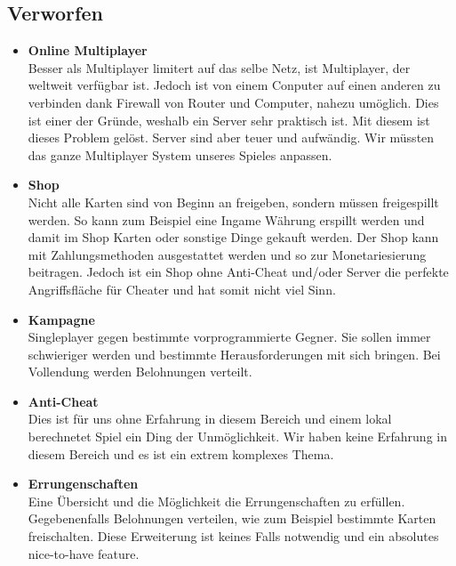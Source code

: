 \subsection*{Verworfen}
\begin{itemize}
    \item \textbf{Online Multiplayer} \\
        Besser als Multiplayer limitert auf das selbe Netz, ist Multiplayer, der weltweit verfügbar ist. Jedoch ist von einem Conputer auf einen anderen zu
        verbinden dank Firewall von Router und Computer, nahezu umöglich. Dies ist einer der Gründe, weshalb ein Server sehr praktisch ist. Mit diesem ist dieses
        Problem gelöst. Server sind aber teuer und aufwändig. Wir müssten das ganze Multiplayer System unseres Spieles anpassen.
    \item \textbf{Shop} \\
        Nicht alle Karten sind von Beginn an freigeben, sondern müssen freigespillt werden.
        So kann zum Beispiel eine Ingame Währung erspillt werden und damit im Shop Karten oder sonstige Dinge gekauft werden.
        Der Shop kann mit Zahlungsmethoden ausgestattet werden und so zur Monetariesierung beitragen.
        Jedoch ist ein Shop ohne Anti-Cheat und/oder Server die perfekte Angriffsfläche für Cheater und hat somit nicht viel Sinn.
    \item \textbf{Kampagne} \\
        Singleplayer gegen bestimmte vorprogrammierte Gegner. Sie sollen immer schwieriger werden und bestimmte Herausforderungen mit sich bringen.
        Bei Vollendung werden Belohnungen verteilt.
    \item \textbf{Anti-Cheat} \\
        Dies ist für uns ohne Erfahrung in diesem Bereich und einem lokal berechnetet Spiel ein Ding der Unmöglichkeit.
        Wir haben keine Erfahrung in diesem Bereich und es ist ein extrem komplexes Thema.
    \item \textbf{Errungenschaften} \\
        Eine Übersicht und die Möglichkeit die Errungenschaften zu erfüllen.
        Gegebenenfalls Belohnungen verteilen, wie zum Beispiel bestimmte Karten freischalten.
        Diese Erweiterung ist keines Falls notwendig und ein absolutes nice-to-have feature.
\end{itemize}

